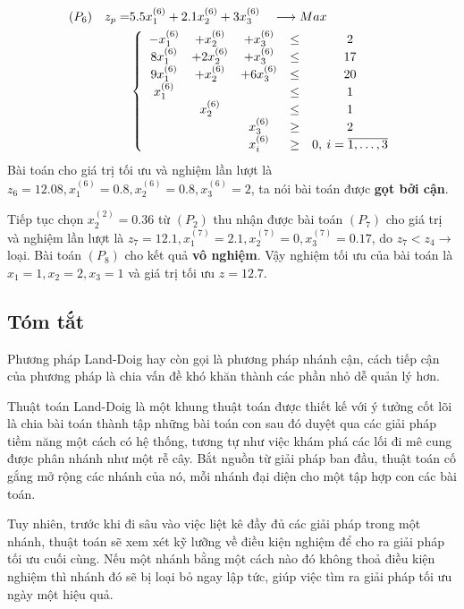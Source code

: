 \documentclass[12pt,a4paper]{report}
\begin{document}
    \begin{equation*}
      \begin{split}
          (P_6) \quad z_p= & 5.5x^{(6)}_1 + 2.1x^{(6)}_2 + 3x^{(6)}_3 \quad \longrightarrow Max \\
          & \left\{\begin{array} {ccccc}
           -x^{(6)}_1 &+ x^{(6)}_2 &+ x^{(6)}_3 &\leq& 2 \\
           8x^{(6)}_1 &+ 2x^{(6)}_2 &+ x^{(6)}_3&\leq &17 \\
           9x^{(6)}_1 &+ x^{(6)}_2 &+ 6x^{(6)}_3 &\leq& 20 \\
           x^{(6)}_1&& &\leq& 1 \\
           &x^{(6)}_2& &\leq& 1 \\
           &&x^{(6)}_3& \geq &2 \\
          &&x^{(6)}_i &\geq &0 , \: i=\overline{\rm 1, \ldots ,3} \\
          \end{array}\right. \\
      \end{split}
    \end{equation*}
    Bài toán cho giá trị tối ưu và nghiệm lần lượt là  $z_6=12.08, x^{(6)}_1=0.8, x^{(6)}_2=0.8, x^{(6)}_3=2$, ta nói bài toán được \textbf{gọt bởi cận}.
    
Tiếp tục chọn $x^{(2)}_2=0.36$ từ $(P_2)$ thu nhận được bài toán $(P_7)$ cho giá trị và nghiệm lần lượt là $z_7=12.1, x^{(7)}_1=2.1, x^{(7)}_2=0, x^{(7)}_3=0.17$, do $z_7<z_4 \rightarrow$ loại. Bài toán $(P_8)$ cho kết quả \textbf{vô nghiệm}. Vậy nghiệm tối ưu của bài toán là $x_1=1, x_2=2, x_3=1$ và giá trị tối ưu $z=12.7$.
\subsection*{Tóm tắt}
Phương pháp Land-Doig hay còn gọi là phương pháp nhánh cận, cách tiếp cận của phương pháp là chia vấn đề khó khăn thành các phần nhỏ dễ quản lý hơn.

Thuật toán Land-Doig là một khung thuật toán được thiết kế với ý tưởng cốt lõi là chia bài toán thành tập những bài toán con sau đó duyệt qua các giải pháp tiềm năng một cách có hệ thống, tương tự như việc khám phá các lối đi mê cung được phân nhánh như một rễ cây. Bắt nguồn từ giải pháp ban đầu, thuật toán cố gắng mở rộng các nhánh của nó, mỗi nhánh đại diện cho một tập hợp con các bài toán.

Tuy nhiên, trước khi đi sâu vào việc liệt kê đầy đủ các giải pháp trong một nhánh, thuật toán sẽ xem xét kỹ lưỡng về điều kiện nghiệm để cho ra giải pháp tối ưu cuối cùng. Nếu một nhánh bằng một cách nào đó không thoả điều kiện nghiệm thì nhánh đó sẽ bị loại bỏ ngay lập tức, giúp việc tìm ra giải pháp tối ưu ngày một hiệu quả.
        
\end{document}
